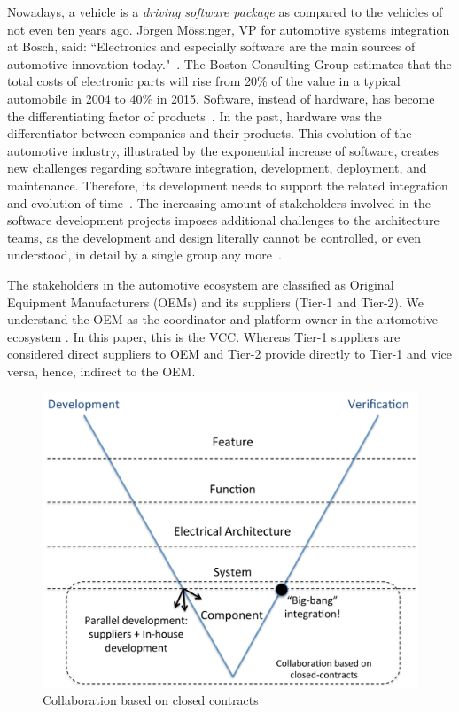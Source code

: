 Nowadays, a vehicle is a {\em driving software package} as compared to the vehicles of not even ten years ago. J\"orgen M\"ossinger, VP for automotive systems integration at Bosch, said: ``Electronics and especially software are the main sources of automotive innovation today."~\cite{Mossinger2010SoftwareAutomotive}. The Boston Consulting Group estimates that the total costs of electronic parts will rise from 20\% of the value in a typical automobile in 2004 to 40\% in 2015. Software, instead of hardware, has become the differentiating factor of products~\cite{ConnectedVehicle2012,hbr2015hardwaresoftware,Mossinger2010SoftwareAutomotive,Broy:2006:CAS:1134285.1134292}. In the past, hardware was the differentiator between companies and their products. This evolution of the automotive industry, illustrated by the exponential increase of software, creates new challenges regarding software integration, development, deployment, and maintenance. Therefore, its development needs to support the related integration and evolution of time~\cite{Broy:2006:CAS:1134285.1134292,Patrizio2016AAF_Chalmers,qualman2009socialnomics,JansenTale2009}. The increasing amount of stakeholders involved in the software development projects imposes additional challenges to the architecture teams, as the development and design literally cannot be controlled, or even understood, in detail by a single group any more~\cite{Patrizio2016AAF_Chalmers}. 


The stakeholders in the automotive ecosystem are classified as Original Equipment Manufacturers (OEMs) and its suppliers (Tier-1 and Tier-2). We understand the OEM as the coordinator and platform owner in the automotive ecosystem \cite{KS15,Patrizio2016AAF_Chalmers}. In this paper, this is the VCC. Whereas Tier-1 suppliers are considered direct suppliers to OEM and Tier-2 provide directly to Tier-1 and vice versa, hence, indirect to the OEM. 

\begin{figure}[htb]
\centering
\includegraphics[width=\columnwidth]{figure/Closed-contract-collaboration.pdf}
\caption{Collaboration based on closed contracts}
\label{fig:closedContractCollaboration}
\end{figure}

